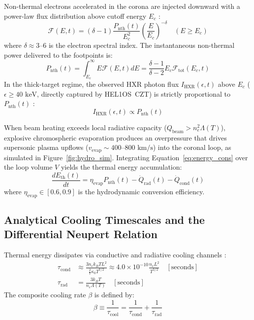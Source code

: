 \documentclass[11pt,a4paper,twocolumn]{article}
\newcommand{\helos}{HEL1OS}
\begin{document}
Non-thermal electrons accelerated in the corona are injected downward with a power-law flux distribution above cutoff energy $E_c$ \citep{brown1971,emslie1978}:
\begin{equation}
\mathcal{F}(E, t) = (\delta - 1) \frac{P_{\mathrm{nth}}(t)}{E_c^2} \left( \frac{E}{E_c} \right)^{-\delta} \quad (E \ge E_c)
\label{eq:flux_powerlaw}
\end{equation}
where $\delta \approx 3\text{--}6$ is the electron spectral index. The instantaneous non-thermal power delivered to the footpoints is:
\begin{equation}
P_{\mathrm{nth}}(t) = \int_{E_c}^\infty E \mathcal{F}(E, t) dE = \frac{\delta - 1}{\delta - 2} E_c \mathcal{F}_{\mathrm{tot}}(E_c, t)
\label{eq:power_thick}
\end{equation}
In the thick-target regime, the observed HXR photon flux $I_{\mathrm{HXR}}(\epsilon, t)$ above $E_c$ ($\epsilon \ge 40\text{ keV}$, directly captured by \helos\ CZT) is strictly proportional to $P_{\mathrm{nth}}(t)$ \citep{brown1971}:
\begin{equation}
I_{\mathrm{HXR}}(\epsilon, t) \propto P_{\mathrm{nth}}(t)
\label{eq:hxr_prop_power}
\end{equation}

When beam heating exceeds local radiative capacity ($Q_{\mathrm{beam}} > n_e^2 \Lambda(T)$), explosive chromospheric evaporation produces an overpressure that drives supersonic plasma upflows ($v_{\mathrm{evap}} \sim 400\text{--}800\text{ km/s}$) into the coronal loop, as simulated in Figure~\ref{fig:hydro_sim}. Integrating Equation~\eqref{eq:energy_cons} over the loop volume $V$ yields the thermal energy accumulation:
\begin{equation}
\frac{d E_{\mathrm{th}}(t)}{dt} = \eta_{\mathrm{evap}} P_{\mathrm{nth}}(t) - \dot{Q}_{\mathrm{rad}}(t) - \dot{Q}_{\mathrm{cond}}(t)
\label{eq:thermal_accum}
\end{equation}
where $\eta_{\mathrm{evap}} \in [0.6, 0.9]$ is the hydrodynamic conversion efficiency.

\subsection{Analytical Cooling Timescales and the Differential Neupert Relation}
\label{sec:cooling_derivation}

Thermal energy dissipates via conductive and radiative cooling channels \citep{cargill1995,veronig2005}:
\begin{align}
\tau_{\mathrm{cond}} &\approx \frac{3 n_e k_B T L^2}{\frac{2}{7}\kappa_0 T^{7/2}} \approx 4.0 \times 10^{-10} \frac{n_e L^2}{T^{5/2}}\quad [\text{seconds}] \label{eq:tau_cond}\\
\tau_{\mathrm{rad}} &= \frac{3 k_B T}{n_e \Lambda(T)} \quad [\text{seconds}] \label{eq:tau_rad}
\end{align}
The composite cooling rate $\beta$ is defined by:
\begin{equation}
\beta \equiv \frac{1}{\tau_{\mathrm{cool}}} = \frac{1}{\tau_{\mathrm{cond}}} + \frac{1}{\tau_{\mathrm{rad}}}
\label{eq:beta_def}
\end{equation}
\end{document}
